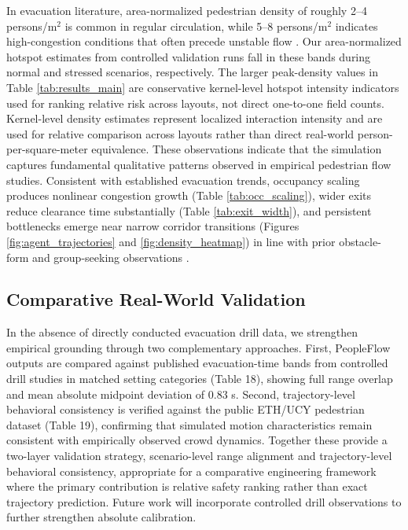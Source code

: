 \documentclass[journal]{IEEEtran}
\begin{document}
In evacuation literature, area-normalized pedestrian density of roughly 2--4 persons/m$^2$ is common in regular circulation, while 5--8 persons/m$^2$ indicates high-congestion conditions that often precede unstable flow \cite{fruin,crowd_book,haghani2020}. Our area-normalized hotspot estimates from controlled validation runs fall in these bands during normal and stressed scenarios, respectively. The larger peak-density values in Table \ref{tab:results_main} are conservative kernel-level hotspot intensity indicators used for ranking relative risk across layouts, not direct one-to-one field counts. Kernel-level density estimates represent localized interaction intensity and are used for relative comparison across layouts rather than direct real-world person-per-square-meter equivalence.
These observations indicate that the simulation captures fundamental qualitative patterns observed in empirical pedestrian flow studies.
Consistent with established evacuation trends, occupancy scaling produces nonlinear congestion growth (Table \ref{tab:occ_scaling}), wider exits reduce clearance time substantially (Table \ref{tab:exit_width}), and persistent bottlenecks emerge near narrow corridor transitions (Figures \ref{fig:agent_trajectories} and \ref{fig:density_heatmap}) in line with prior obstacle-form and group-seeking observations \cite{yano2018obstacle,chen2021entropy}.

\subsection{Comparative Real-World Validation}
In the absence of directly conducted evacuation drill data, we strengthen empirical grounding through two complementary approaches. First, PeopleFlow outputs are compared against published evacuation-time bands from controlled drill studies in matched setting categories (Table 18), showing full range overlap and mean absolute midpoint deviation of 0.83 s. Second, trajectory-level behavioral consistency is verified against the public ETH/UCY pedestrian dataset (Table 19), confirming that simulated motion characteristics remain consistent with empirically observed crowd dynamics. Together these provide a two-layer validation strategy, scenario-level range alignment and trajectory-level behavioral consistency, appropriate for a comparative engineering framework where the primary contribution is relative safety ranking rather than exact trajectory prediction. Future work will incorporate controlled drill observations to further strengthen absolute calibration.
\end{document}
